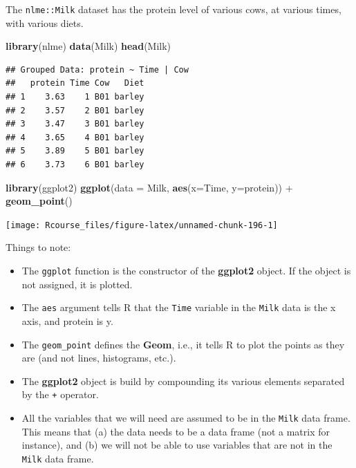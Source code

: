 \documentclass[]{book}
\newenvironment{Shaded}{\begin{snugshade}}{\end{snugshade}}
\newcommand{\KeywordTok}[1]{\textcolor[rgb]{0.13,0.29,0.53}{\textbf{{#1}}}}
\newcommand{\DataTypeTok}[1]{\textcolor[rgb]{0.13,0.29,0.53}{{#1}}}
\newcommand{\StringTok}[1]{\textcolor[rgb]{0.31,0.60,0.02}{{#1}}}
\newcommand{\NormalTok}[1]{{#1}}
\providecommand{\tightlist}{%
  \setlength{\itemsep}{0pt}\setlength{\parskip}{0pt}}
\theoremstyle{definition}
\theoremstyle{definition}
\theoremstyle{remark}
\begin{document}
The \texttt{nlme::Milk} dataset has the protein level of various cows,
at various times, with various diets.

\begin{Shaded}
\begin{Highlighting}[]
\KeywordTok{library}\NormalTok{(nlme)}
\KeywordTok{data}\NormalTok{(Milk)}
\KeywordTok{head}\NormalTok{(Milk)}
\end{Highlighting}
\end{Shaded}

\begin{verbatim}
## Grouped Data: protein ~ Time | Cow
##   protein Time Cow   Diet
## 1    3.63    1 B01 barley
## 2    3.57    2 B01 barley
## 3    3.47    3 B01 barley
## 4    3.65    4 B01 barley
## 5    3.89    5 B01 barley
## 6    3.73    6 B01 barley
\end{verbatim}

\begin{Shaded}
\begin{Highlighting}[]
\KeywordTok{library}\NormalTok{(ggplot2)}
\KeywordTok{ggplot}\NormalTok{(}\DataTypeTok{data =} \NormalTok{Milk, }\KeywordTok{aes}\NormalTok{(}\DataTypeTok{x=}\NormalTok{Time, }\DataTypeTok{y=}\NormalTok{protein)) +}
\StringTok{  }\KeywordTok{geom_point}\NormalTok{()}
\end{Highlighting}
\end{Shaded}

\texttt{[image: Rcourse\_files/figure-latex/unnamed-chunk-196-1]}

Things to note:

\begin{itemize}
\tightlist
\item
  The \texttt{ggplot} function is the constructor of the
  \textbf{ggplot2} object. If the object is not assigned, it is plotted.
\item
  The \texttt{aes} argument tells R that the \texttt{Time} variable in
  the \texttt{Milk} data is the x axis, and protein is y.
\item
  The \texttt{geom\_point} defines the \textbf{Geom}, i.e., it tells R
  to plot the points as they are (and not lines, histograms, etc.).
\item
  The \textbf{ggplot2} object is build by compounding its various
  elements separated by the \texttt{+} operator.
\item
  All the variables that we will need are assumed to be in the
  \texttt{Milk} data frame. This means that (a) the data needs to be a
  data frame (not a matrix for instance), and (b) we will not be able to
  use variables that are not in the \texttt{Milk} data frame.
\end{itemize}
\end{document}
